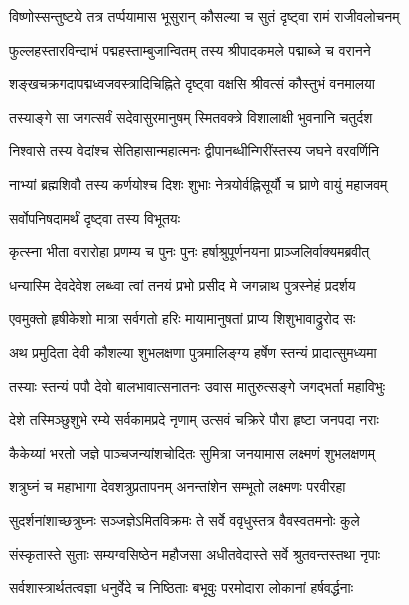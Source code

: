 \twolineshloka
{विष्णोस्सन्तुष्टये तत्र तर्प्पयामास भूसुरान्}
{कौसल्या च सुतं दृष्ट्वा रामं राजीवलोचनम्}%

\twolineshloka
{फुल्लहस्तारविन्दाभं पद्महस्ताम्बुजान्वितम्}
{तस्य श्रीपादकमले पद्माब्जे च वरानने}%

\twolineshloka
{शङ्खचक्रगदापद्मध्वजवस्त्रादिचिह्निते}
{दृष्ट्वा वक्षसि श्रीवत्सं कौस्तुभं वनमालया}%

\twolineshloka
{तस्याङ्गे सा जगत्सर्वं सदेवासुरमानुषम्}
{स्मितवक्त्रे विशालाक्षी भुवनानि चतुर्दश}%

\twolineshloka
{निश्वासे तस्य वेदांश्च सेतिहासान्महात्मनः}
{द्वीपानब्धीन्गिरींस्तस्य जघने वरवर्णिनि}%

\twolineshloka
{नाभ्यां ब्रह्मशिवौ तस्य कर्णयोश्च दिशः शुभाः}
{नेत्रयोर्वह्निसूर्यौ च घ्राणे वायुं महाजवम्}%

सर्वोपनिषदामर्थं दृष्ट्वा तस्य विभूतयः

\twolineshloka
{कृत्स्ना भीता वरारोहा प्रणम्य च पुनः पुनः}
{हर्षाश्रुपूर्णनयना प्राञ्जलिर्वाक्यमब्रवीत्}%


\twolineshloka
{धन्यास्मि देवदेवेश लब्ध्वा त्वां तनयं प्रभो}
{प्रसीद मे जगन्नाथ पुत्रस्नेहं प्रदर्शय}%


\twolineshloka
{एवमुक्तो हृषीकेशो मात्रा सर्वगतो हरिः}
{मायामानुषतां प्राप्य शिशुभावाद्रुरोद सः}%

\twolineshloka
{अथ प्रमुदिता देवी कौशल्या शुभलक्षणा}
{पुत्रमालिङ्ग्य हर्षेण स्तन्यं प्रादात्सुमध्यमा}%

\twolineshloka
{तस्याः स्तन्यं पपौ देवो बालभावात्सनातनः}
{उवास मातुरुत्सङ्गे जगद्भर्ता महाविभुः}%

\twolineshloka
{देशे तस्मिञ्छुशुभे रम्ये सर्वकामप्रदे नृणाम्}
{उत्सवं चक्रिरे पौरा हृष्टा जनपदा नराः}%

\twolineshloka
{कैकेय्यां भरतो जज्ञे पाञ्चजन्यांशचोदितः}
{सुमित्रा जनयामास लक्ष्मणं शुभलक्षणम्}%

\twolineshloka
{शत्रुघ्नं च महाभागा देवशत्रुप्रतापनम्}
{अनन्तांशेन सम्भूतो लक्ष्मणः परवीरहा}%

\twolineshloka
{सुदर्शनांशाच्छत्रुघ्नः सञ्जज्ञेऽमितविक्रमः}
{ते सर्वे ववृधुस्तत्र वैवस्वतमनोः कुले}%

\twolineshloka
{संस्कृतास्ते सुताः सम्यग्वसिष्ठेन महौजसा}
{अधीतवेदास्ते सर्वे श्रुतवन्तस्तथा नृपाः}%

\twolineshloka
{सर्वशास्त्रार्थतत्वज्ञा धनुर्वेदे च निष्ठिताः}
{बभूवुः परमोदारा लोकानां हर्षवर्द्धनाः}%

